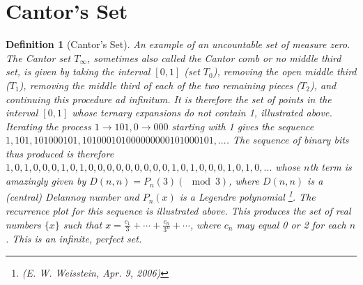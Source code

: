 \documentclass[10pt]{report}
\newtheorem{def2}{Definition}[section]
\begin{document}
\section{Cantor's Set}
\begin{def2}[Cantor's Set]
An example of an uncountable set of measure zero. \\
The Cantor set $T_\infty$, sometimes also called the Cantor comb or no middle third set, is given by taking the interval $[0,1]$ (set $T_0$), removing the open middle third ($T_1$), removing the middle third of each of the two remaining pieces ($T_2$), and continuing this procedure ad infinitum. It is therefore the set of points in the interval $[0,1]$ whose ternary expansions do not contain 1, illustrated above.
Iterating the process $1\to 101, 0 \to 000$ starting with 1 gives the sequence $1, 101, 101000101, 101000101000000000101000101, ...$. The sequence of binary bits thus produced is therefore $1, 0, 1, 0, 0, 0, 1, 0, 1, 0, 0, 0, 0, 0, 0, 0, 0, 0, 1, 0, 1, 0, 0, 0, 1, 0, 1, 0, ...$ whose $n$th term is amazingly given by $D(n,n)=P_n(3)(\mod 3)$, where $D(n,n)$ is a (central) Delannoy number and $P_n(x)$ is a Legendre polynomial \footnote{(E. W. Weisstein, Apr. 9, 2006)}. The recurrence plot for this sequence is illustrated above.
This produces the set of real numbers $\{x\}$ such that
$x=\frac{c_1}{3}+\cdots+\frac{c_n}{3^n}+\cdots$,
where $c_n$ may equal 0 or 2 for each $n$. This is an infinite, perfect set.
\end{def2}
\end{document}
